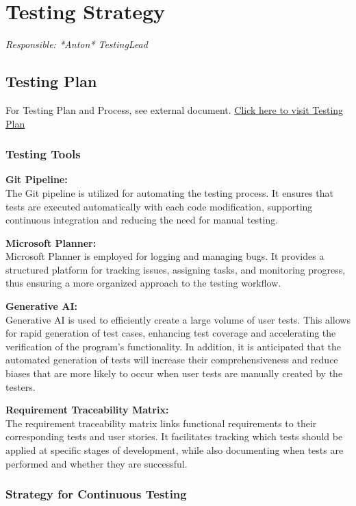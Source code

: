 \documentclass{article}
\begin{document}
\newpage
\section{Testing Strategy}
\textit{Responsible: *Anton* TestingLead}

\subsection{Testing Plan}
For Testing Plan and Process, see external document. \href{https://www.overleaf.com/project/66ff9154fca1f68722259739}{Click here to visit Testing Plan}


\subsubsection{Testing Tools}

\textbf{Git Pipeline:} \\
The Git pipeline is utilized for automating the testing process. It ensures that tests are executed automatically with each code modification, supporting continuous integration and reducing the need for manual testing.

\textbf{Microsoft Planner:}\\ 
Microsoft Planner is employed for logging and managing bugs. It provides a structured platform for tracking issues, assigning tasks, and monitoring progress, thus ensuring a more organized approach to the testing workflow.

\textbf{Generative AI:}\\
Generative AI is used to efficiently create a large volume of user tests. This allows for rapid generation of test cases, enhancing test coverage and accelerating the verification of the program’s functionality. In addition, it is anticipated that the automated generation of tests will increase their comprehensiveness and reduce biases that are more likely to occur when user tests are manually created by the testers.

\textbf{Requirement Traceability Matrix:} \\
The requirement traceability matrix links functional requirements to their corresponding tests and user stories. It facilitates tracking which tests should be applied at specific stages of development, while also documenting when tests are performed and whether they are successful.

\subsubsection{Strategy for Continuous Testing}
\end{document}
